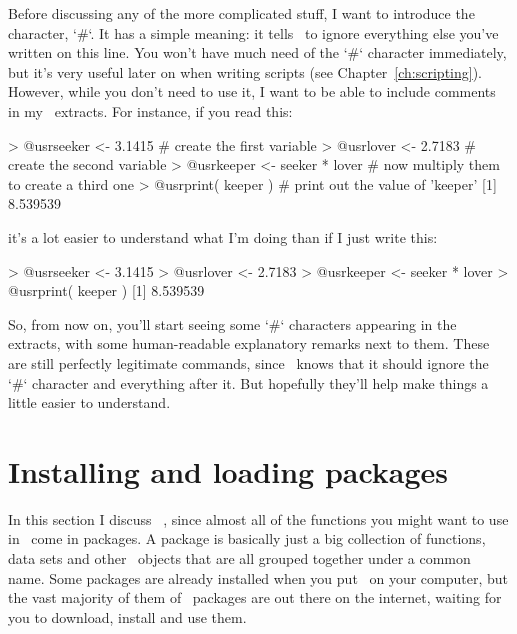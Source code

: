 Before discussing any of the more complicated stuff, I want to introduce the  character, \rtextverb`#`. It has a simple meaning: it tells \R\ to ignore everything else you've written on this line. You won't have much need of the \rtextverb`#` character immediately, but it's very useful later on when writing scripts (see Chapter~\ref{ch:scripting}). However, while you don't need to use it, I want to be able to include comments in my \R\ extracts. For instance, if you read this:
\begin{rblock1}
> @usr{seeker <- 3.1415}           # create the first variable
> @usr{lover <- 2.7183}            # create the second variable
> @usr{keeper <- seeker * lover}   # now multiply them to create a third one
> @usr{print( keeper )}            # print out the value of 'keeper'
[1] 8.539539
\end{rblock1}
it's a lot easier to understand what I'm doing than if I just write this:
\begin{rblock1}
> @usr{seeker <- 3.1415}
> @usr{lover <- 2.7183}
> @usr{keeper <- seeker * lover}
> @usr{print( keeper )}    
[1] 8.539539
\end{rblock1}
So, from now on, you'll start seeing some \rtextverb`#` characters appearing in the extracts, with some human-readable explanatory remarks next to them. These are still perfectly legitimate commands, since \R\ knows that it should ignore the \rtextverb`#` character and everything after it. But hopefully they'll help make things a little easier to understand.

\section{Installing and loading packages~\label{sec:packageinstall}}


In this section I discuss \R\ , since almost all of the functions you might want to use in \R\ come in packages. A package is basically just a big collection of functions, data sets and other \R\ objects that are all grouped together under a common name. Some packages are already installed when you put \R\ on your computer, but the vast majority of them of \R\ packages are out there on the internet, waiting for you to download, install and use them. 

